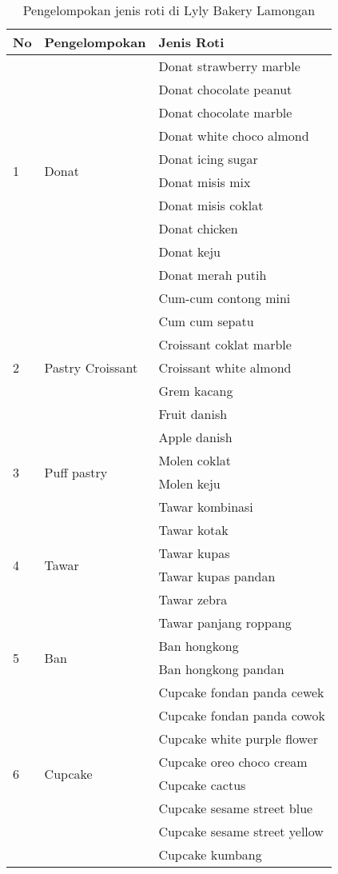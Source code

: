 \begin{longtable}{|l|l|l|}
	\caption{Pengelompokan jenis roti di Lyly Bakery Lamongan} \\
	\hline
	No & Pengelompokan & Jenis Roti \\ \hline
	\multirow{10}{*}{1} & \multirow{10}{*}{Donat} & Donat strawberry marble \\ \cline{3-3}
	& & Donat chocolate peanut \\ \cline{3-3}
	& & Donat chocolate marble \\ \cline{3-3}
	& & Donat white choco almond \\ \cline{3-3}
	& & Donat icing sugar \\ \cline{3-3}
	& & Donat misis mix \\ \cline{3-3}
	& & Donat misis coklat \\ \cline{3-3}
	& & Donat chicken \\ \cline{3-3}
	& & Donat keju \\ \cline{3-3}
	& & Donat merah putih \\ \hline
	\multirow{7}{*}{2} & \multirow{7}{*}{Pastry Croissant} & Cum-cum contong mini \\ \cline{3-3}
	& & Cum cum sepatu \\ \cline{3-3}
	& & Croissant coklat marble \\ \cline{3-3}
	& & Croissant white almond \\ \cline{3-3}
	& & Grem kacang \\ \cline{3-3}
	& & Fruit danish \\ \cline{3-3}
	& & Apple danish \\ \hline
	\multirow{2}{*}{3} & \multirow{2}{*}{Puff pastry} & Molen coklat \\ \cline{3-3}
	& & Molen keju \\ \hline
	\multirow{6}{*}{4} & \multirow{6}{*}{Tawar} & Tawar kombinasi \\ \cline{3-3}
	& & Tawar kotak \\ \cline{3-3}
	& & Tawar kupas \\ \cline{3-3}
	& & Tawar kupas pandan \\ \cline{3-3}
	& & Tawar zebra \\ \cline{3-3}
	& & Tawar panjang roppang \\ \hline
	\multirow{2}{*}{5} & \multirow{2}{*}{Ban} & Ban hongkong \\ \cline{3-3}
	& & Ban hongkong pandan \\ \hline
	\multirow{8}{*}{6} & \multirow{8}{*}{Cupcake} & Cupcake fondan panda cewek \\ \cline{3-3}
	& & Cupcake fondan panda cowok \\ \cline{3-3}
	& & Cupcake white purple flower \\ \cline{3-3}
	& & Cupcake oreo choco cream \\ \cline{3-3}
	& & Cupcake cactus \\ \cline{3-3}
	& & Cupcake sesame street blue \\ \cline{3-3}
	& & Cupcake sesame street yellow \\ \cline{3-3}
	& & Cupcake kumbang \\ \hline
\end{longtable}

